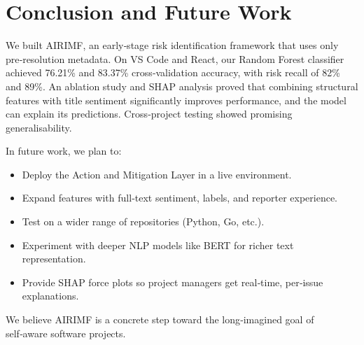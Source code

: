 \documentclass[conference]{IEEEtran}
\begin{document}
\section{Conclusion and Future Work}
We built AIRIMF, an early‑stage risk identification framework that uses only pre‑resolution metadata. On VS Code and React, our Random Forest classifier achieved 76.21\% and 83.37\% cross‑validation accuracy, with risk recall of 82\% and 89\%. An ablation study and SHAP analysis proved that combining structural features with title sentiment significantly improves performance, and the model can explain its predictions. Cross‑project testing showed promising generalisability.

In future work, we plan to:
\begin{itemize}
    \item Deploy the Action and Mitigation Layer in a live environment.
    \item Expand features with full‑text sentiment, labels, and reporter experience.
    \item Test on a wider range of repositories (Python, Go, etc.).
    \item Experiment with deeper NLP models like BERT for richer text representation.
    \item Provide SHAP force plots so project managers get real‑time, per‑issue explanations.
\end{itemize}

We believe AIRIMF is a concrete step toward the long‑imagined goal of self‑aware software projects.
\end{document}
